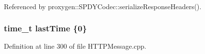 Referenced by proxygen\+::\+S\+P\+D\+Y\+Codec\+::serialize\+Response\+Headers().

\subsubsection[{last\+Time}]{\setlength{\rightskip}{0pt plus 5cm}time\+\_\+t last\+Time \{0\}}\label{HTTPMessage_8cpp_a9a8ce27fc2a03316649058e288233cf8}


Definition at line 300 of file H\+T\+T\+P\+Message.\+cpp.

